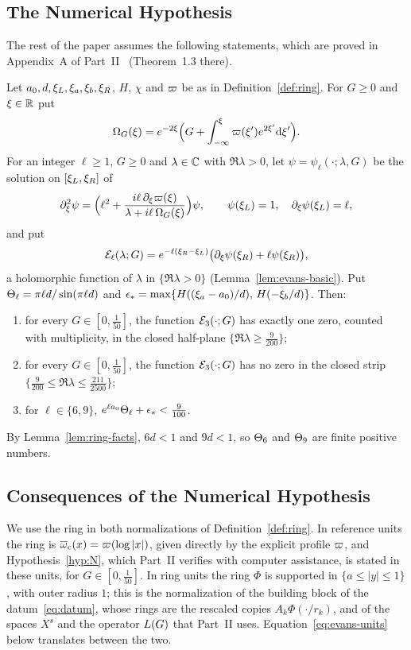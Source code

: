 \subsection{The Numerical Hypothesis}

The rest of the paper assumes the following statements, which are proved in
Appendix~A of Part~II~\cite{PartII} (Theorem~1.3 there).

\begin{hypothesis}
\label{hyp:N}
Let $a_0,d,\xi_L,\xi_a,\xi_b,\xi_R$, $H$, $\chi$ and $\varpi$ be as in
Definition~\ref{def:ring}. For $G\ge0$ and $\xi\in\mathbb{R}$ put
\[
\Omega_G(\xi)=e^{-2\xi}\Big(G+\int_{-\infty}^{\xi}\varpi(\xi')e^{2\xi'}\dd\xi'\Big).
\]
For an integer $\ell\ge1$, $G\ge0$ and $\lambda\in\mathbb{C}$ with $\Re\lambda>0$, let
$\psi=\psi_\ell(\cdot;\lambda,G)$ be the solution on $[\xi_L,\xi_R]$ of
\[
\partial_\xi^2\psi=\Big(\ell^2+\frac{i\ell\,\partial_\xi\varpi(\xi)}{\lambda+i\ell\,\Omega_G(\xi)}\Big)\psi,\qquad
\psi(\xi_L)=1,\quad\partial_\xi\psi(\xi_L)=\ell,
\]
and put
\[
\mathcal{E}_\ell(\lambda;G)=e^{-\ell(\xi_R-\xi_L)}\big(\partial_\xi\psi(\xi_R)+\ell\psi(\xi_R)\big),
\]
a holomorphic function of $\lambda$ in $\{\Re\lambda>0\}$
(Lemma~\ref{lem:evans-basic}). Put $\Theta_{\ell}=\pi\ell d/\sin(\pi\ell d)$ and
$\epsilon_*=\max\{H((\xi_a-a_0)/d),\,H(-\xi_b/d)\}$. Then:
\begin{enumerate}[label=\textup{(N\arabic*)}]
\item for every $G\in[0,\frac1{50}]$, the function $\mathcal{E}_3(\cdot;G)$ has
  exactly one zero, counted with multiplicity, in the closed half-plane
  $\{\Re\lambda\ge\frac9{200}\}$;
\item for every $G\in[0,\frac1{50}]$, the function $\mathcal{E}_3(\cdot;G)$ has no
  zero in the closed strip $\{\frac9{200}\le\Re\lambda\le\frac{211}{2500}\}$;
\item for $\ell\in\{6,9\}$, $e^{\ell a_0}\Theta_{\ell}+\epsilon_*<\frac9{100}$.
\end{enumerate}
\end{hypothesis}

By Lemma~\ref{lem:ring-facts}, $6d<1$ and $9d<1$, so $\Theta_{6}$ and $\Theta_{9}$ are
finite positive numbers.

\subsection{Consequences of the Numerical Hypothesis}

We use the ring in both normalizations of Definition~\ref{def:ring}. In reference
units the ring is $\overline{\omega}_{\mathrm{c}}(x)=\varpi(\log|x|)$, given directly by the explicit profile
$\varpi$, and Hypothesis~\ref{hyp:N}, which Part~II verifies with computer
assistance, is stated in these units, for $G\in[0,\frac1{50}]$. In ring units the
ring $\Phi$ is supported in $\{a\le|y|\le1\}$, with outer radius $1$; this is the
normalization of the building block of the datum~\eqref{eq:datum}, whose rings are
the rescaled copies $A_k\Phi(\cdot/r_k)$, and of the spaces $X^s$ and the operator
$L(G)$ that Part~II uses. Equation~\eqref{eq:evans-units} below translates
between the two.

